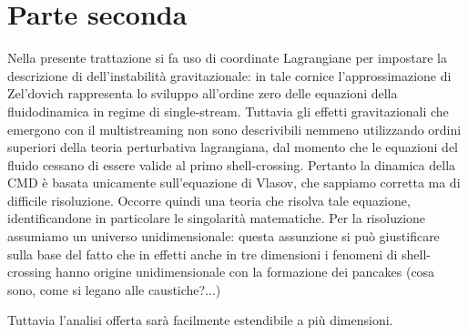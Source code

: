 \section{Parte seconda}

Nella presente trattazione si fa uso di coordinate Lagrangiane per impostare la descrizione di dell'instabilità
gravitazionale: in tale cornice l'approssimazione di Zel'dovich rappresenta lo sviluppo all'ordine zero delle
equazioni della fluidodinamica in regime di single-stream.
Tuttavia gli effetti gravitazionali che emergono con il multistreaming non sono descrivibili nemmeno utilizzando
ordini superiori della teoria perturbativa lagrangiana, dal momento che le equazioni del fluido cessano di essere
valide al primo shell-crossing. Pertanto la dinamica della CMD è basata unicamente sull'equazione di Vlasov, che 
sappiamo corretta ma di difficile risoluzione. Occorre quindi una teoria che risolva tale equazione, identificandone
in particolare le singolarità matematiche. Per la risoluzione assumiamo un universo unidimensionale: questa assunzione
si può giustificare sulla base del fatto che in effetti anche in tre dimensioni i fenomeni di shell-crossing hanno 
origine unidimensionale con la formazione dei pancakes (cosa sono, come si legano alle caustiche?...)

Tuttavia l'analisi offerta sarà facilmente estendibile a più dimensioni.



